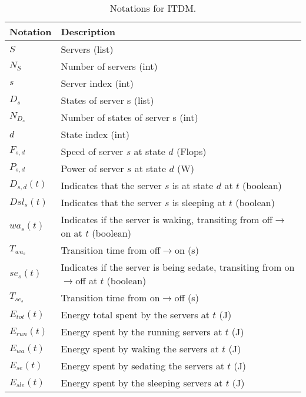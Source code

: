 \begin{table*}[!htb]
\centering
\caption{Notations for ITDM.}
\label{tab:notation_it}
\begin{tabular}{l|l}
    \hline
    Notation & Description \\\hline\hline
    $S$ & Servers (list) \\
    $N_{S}$ & Number of servers (int) \\
    $s$ & Server index (int) \\
    $D_s$ & States of server s (list) \\
    $N_{D_{s}}$ & Number of states of server s (int) \\
    $d$ & State index (int) \\
    $F_{s,d}$ & Speed of server $s$ at state $d$ (Flops)\\
    $P_{s,d}$ & Power of server $s$ at state $d$ (W)\\
    $D_{s,d}(t)$ & Indicates that the server $s$ is at state $d$ at $t$ (boolean)\\
    $Dsl_{s}(t)$ & Indicates that the server $s$ is sleeping at $t$ (boolean)\\
    $wa_s(t)$ & Indicates if the server is waking, transiting from off$\rightarrow$on at $t$ (boolean) \\
    $T_{wa_s}$ & Transition time from off$\rightarrow$on (s) \\
    $se_s(t)$ & Indicates if the server is being sedate, transiting from on$\rightarrow$off at $t$ (boolean) \\
    $T_{se_s}$ & Transition time from on$\rightarrow$off (s) \\    
    $E_{tot}(t)$ & Energy total spent by the servers at $t$ (J) \\
    $E_{run}(t)$ & Energy spent by the running servers at $t$ (J) \\
    $E_{wa}(t)$ & Energy spent by waking the servers at $t$ (J) \\
    $E_{se}(t)$ & Energy spent by sedating the servers at $t$ (J) \\
    $E_{sle}(t)$ & Energy spent by the sleeping servers at $t$ (J) \\
    \hline
\end{tabular}
\end{table*}